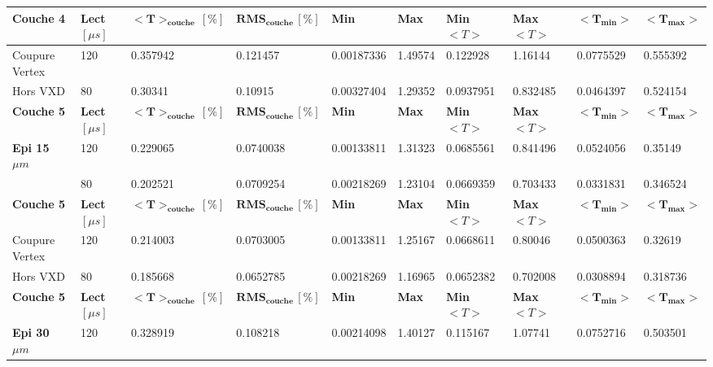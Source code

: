 \begin{table}
\begin{center}
\begin{tabular}{|l|l|l|l|l|l|l|l|l|l|}
\textbf{Couche 4} & \textbf{Lect} $[\mu s]$ & $\mathbf{<T>_{couche} \, [\%]}$ & $\mathbf{RMS_{couche} \, [\%]}$ & \textbf{Min} & \textbf{Max} & \textbf{Min} $<T>$ & \textbf{Max} $<T>$ & $\mathbf{<T_{min}>}$ & $\mathbf{<T_{max}>}$ \\ \hline
Coupure Vertex                & 120           & 0.357942                 & 0.121457                & 0.00187336 & 1.49574   & 0.122928      & 1.16144       & 0.0775529       & 0.555392        \\ \hline
Hors VXD                      & 80            & 0.30341                  & 0.10915                 & 0.00327404 & 1.29352   & 0.0937951     & 0.832485      & 0.0464397       & 0.524154        \\ \hline
\textbf{Couche 5} & \textbf{Lect} $[\mu s]$ & $\mathbf{<T>_{couche} \, [\%]}$ & $\mathbf{RMS_{couche} \, [\%]}$ & \textbf{Min} & \textbf{Max} & \textbf{Min} $<T>$ & \textbf{Max} $<T>$ & $\mathbf{<T_{min}>}$ & $\mathbf{<T_{max}>}$ \\ \hline
    \textbf{Epi 15} $\mu m$                          & 120           & 0.229065                 & 0.0740038               & 0.00133811 & 1.31323   & 0.0685561     & 0.841496      & 0.0524056       & 0.35149         \\ \hline
                              & 80            & 0.202521                 & 0.0709254               & 0.00218269 & 1.23104   & 0.0669359     & 0.703433      & 0.0331831       & 0.346524        \\ \hline
\textbf{Couche 5} & \textbf{Lect} $[\mu s]$ & $\mathbf{<T>_{couche} \, [\%]}$ & $\mathbf{RMS_{couche} \, [\%]}$ & \textbf{Min} & \textbf{Max} & \textbf{Min} $<T>$ & \textbf{Max} $<T>$ & $\mathbf{<T_{min}>}$ & $\mathbf{<T_{max}>}$ \\ \hline
Coupure Vertex                & 120           & 0.214003                 & 0.0703005               & 0.00133811 & 1.25167   & 0.0668611     & 0.80046       & 0.0500363       & 0.32619         \\ \hline
Hors VXD                      & 80            & 0.185668                 & 0.0652785               & 0.00218269 & 1.16965   & 0.0652382     & 0.702008      & 0.0308894       & 0.318736        \\ \hline
\textbf{Couche 5} & \textbf{Lect} $[\mu s]$ & $\mathbf{<T>_{couche} \, [\%]}$ & $\mathbf{RMS_{couche} \, [\%]}$ & \textbf{Min} & \textbf{Max} & \textbf{Min} $<T>$ & \textbf{Max} $<T>$ & $\mathbf{<T_{min}>}$ & $\mathbf{<T_{max}>}$ \\ \hline
    \textbf{Epi 30} $\mu m$                          & 120           & 0.328919                 & 0.108218                & 0.00214098 & 1.40127   & 0.115167      & 1.07741       & 0.0752716       & 0.503501        \\ \hline

\end{tabular}
\end{center}
\end{table}
